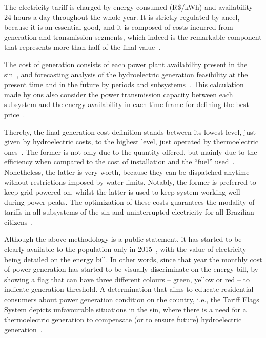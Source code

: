 The electricity tariff is charged by energy consumed (R\$/kWh) and availability -- 24 hours a day throughout the whole year. %
It is strictly regulated by \gls{aneel}, because it is an essential good,
and it is composed of costs incurred from generation and transmission segments,
which indeed is the remarkable component that represents more than half of the final value~\cite{price}.

The cost of generation consists of each power plant availability present in the \gls{sin}~\cite{fontes}, and
forecasting analysis of the hydroelectric generation feasibility at the present time and in the future by periods and subsystems~\cite{arteiro}. %
This calculation made by \gls{ons} also consider the power transmission capacity between each subsystem and the energy availability in each time frame for defining the best price~\cite{fontes}.

Thereby, the final generation cost definition stands between its lowest level, just given by hydroelectric costs, to the highest level, just operated by thermoelectric ones~\cite{arteiro}.
The former is not only due to the quantity offered, but mainly due to the efficiency when compared to the cost of installation and the ``fuel'' used~\cite{fontes}. %
Nonetheless, the latter is very worth, because they can be dispatched anytime without restrictions imposed by water limits.
Notably, the former is preferred to keep grid powered on, whilst the latter is used to keep system working well during power peaks.
The optimization of these costs guarantees the modality of tariffs in all subsystems of the \gls{sin} and uninterrupted electricity for all Brazilian citizens~\cite{arteiro}.

Although the above methodology is a public statement,
it has started to be clearly available to the population only in 2015~\cite{bandeiras},
with the value of electricity being detailed on the energy bill.
In other words, since that year the monthly cost of power generation has started to be visually discriminate on the energy bill,
by showing a flag that can have three different colours -- green, yellow or red -- to indicate generation threshold.
A determination that aims to educate residential consumers %
about power generation condition on the country, i.e.,
the Tariff Flags System depicts unfavourable situations in the \gls{sin},
where there is a need for a thermoelectric generation to compensate (or to ensure future) hydroelectric generation~\cite{bandeiras}.%

